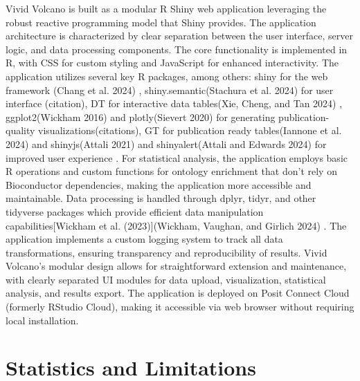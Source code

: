 \documentclass[
]{article}
\begin{document}
Vivid Volcano is built as a modular R Shiny web application leveraging
the robust reactive programming model that Shiny provides. The
application architecture is characterized by clear separation between
the user interface, server logic, and data processing components. The
core functionality is implemented in R, with CSS for custom styling and
JavaScript for enhanced interactivity. The application utilizes several
key R packages, among others: shiny for the web framework (Chang et al.
2024) , shiny.semantic(Stachura et al. 2024) for user interface
(citation), DT for interactive data tables(Xie, Cheng, and Tan 2024) ,
ggplot2(Wickham 2016) and plotly(Sievert 2020) for generating
publication-quality visualizations(citations), GT for publication ready
tables(Iannone et al. 2024) and shinyjs(Attali 2021) and
shinyalert(Attali and Edwards 2024) for improved user experience . For
statistical analysis, the application employs basic R operations and
custom functions for ontology enrichment that don't rely on Bioconductor
dependencies, making the application more accessible and maintainable.
Data processing is handled through dplyr, tidyr, and other tidyverse
packages which provide efficient data manipulation
capabilities{[}Wickham et al. (2023){]}(Wickham, Vaughan, and Girlich
2024) . The application implements a custom logging system to track all
data transformations, ensuring transparency and reproducibility of
results. Vivid Volcano's modular design allows for straightforward
extension and maintenance, with clearly separated UI modules for data
upload, visualization, statistical analysis, and results export. The
application is deployed on Posit Connect Cloud (formerly RStudio Cloud),
making it accessible via web browser without requiring local
installation.

\section{Statistics and Limitations}\label{statistics-and-limitations}
\end{document}
